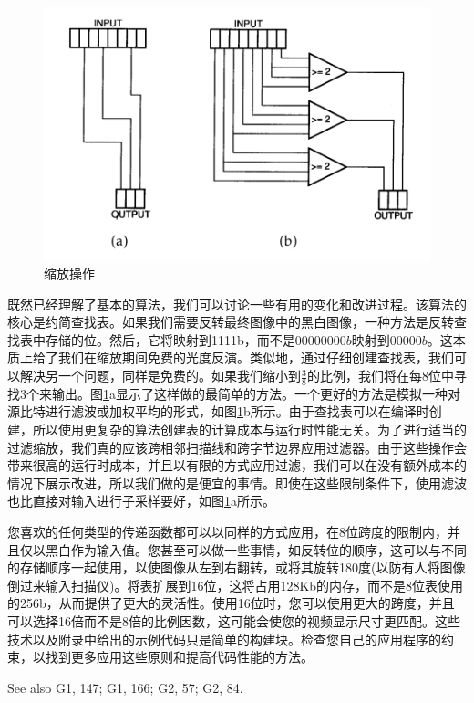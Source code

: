 \begin{CJK}{UTF8}{gbsn}
\begin{figure}[htbp]%
  \centering
  \includegraphics[totalheight=2.3in]{./fig/1.3.1.png}
  \caption{缩放操作} 
  \label{fig:1.3.1}
\end{figure}

既然已经理解了基本的算法，我们可以讨论一些有用的变化和改进过程。该算法的核心是约简查找表。如果我们需要反转最终图像中的黑白图像，一种方法是反转查找表中存储的位。然后，它将映射到1111b，而不是$00000000b$映射到$00000b$。这本质上给了我们在缩放期间免费的光度反演。类似地，通过仔细创建查找表，我们可以解决另一个问题，同样是免费的。如果我们缩小到$\frac{3}{8}$的比例，我们将在每8位中寻找3个来输出。图\ref{fig:1.3.1}a显示了这样做的最简单的方法。一个更好的方法是模拟一种对源比特进行滤波或加权平均的形式，如图\ref{fig:1.3.1}b所示。由于查找表可以在编译时创建，所以使用更复杂的算法创建表的计算成本与运行时性能无关。为了进行适当的过滤缩放，我们真的应该跨相邻扫描线和跨字节边界应用过滤器。由于这些操作会带来很高的运行时成本，并且以有限的方式应用过滤，我们可以在没有额外成本的情况下展示改进，所以我们做的是便宜的事情。即使在这些限制条件下，使用滤波也比直接对输入进行子采样要好，如图\ref{fig:1.3.1}a所示。

您喜欢的任何类型的传递函数都可以以同样的方式应用，在8位跨度的限制内，并且仅以黑白作为输入值。您甚至可以做一些事情，如反转位的顺序，这可以与不同的存储顺序一起使用，以使图像从左到右翻转，或将其旋转180度(以防有人将图像倒过来输入扫描仪)。将表扩展到16位，这将占用128Kb的内存，而不是8位表使用的256b，从而提供了更大的灵活性。使用16位时，您可以使用更大的跨度，并且可以选择16倍而不是8倍的比例因数，这可能会使您的视频显示尺寸更匹配。这些技术以及附录中给出的示例代码只是简单的构建块。检查您自己的应用程序的约束，以找到更多应用这些原则和提高代码性能的方法。

See also G1, 147; G1, 166; G2, 57; G2, 84.




\end{CJK}

